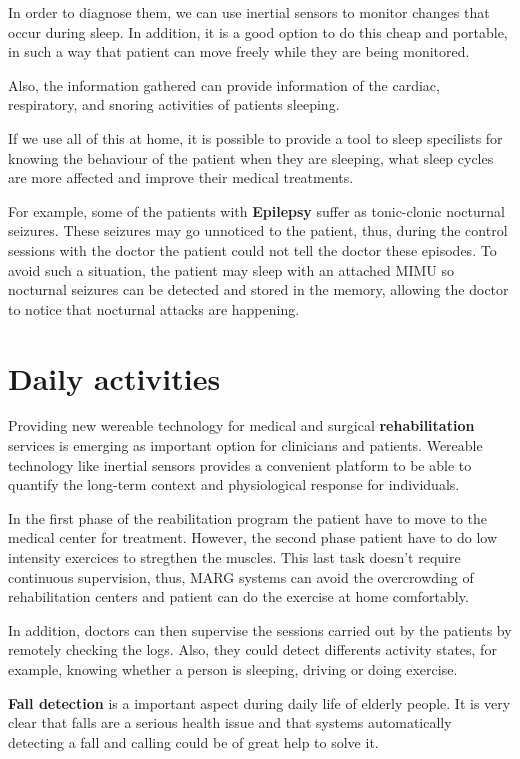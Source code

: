 In order to diagnose them, we can use inertial sensors to monitor changes that occur during sleep. In addition, it is a good option to do this  cheap and portable, in such a way that patient can move freely while they are being monitored\cite{A.Olivares2013}.

Also, the information gathered can provide information  of the cardiac, respiratory, and snoring activities of patients sleeping\cite{SanchezDaniel}.

If we use all of this at home, it is possible to provide a tool to sleep specilists for knowing the behaviour of the patient when they are sleeping, what sleep cycles are more affected and improve their medical  treatments. 

For example,  some of the patients with \textbf{Epilepsy} suffer as tonic-clonic nocturnal seizures. These seizures  may go unnoticed to the patient, thus, during the control sessions with the doctor the patient could not tell the doctor these episodes. To avoid such a situation, the patient may sleep with an attached MIMU so nocturnal seizures can be detected and stored in the memory, allowing the doctor to notice that nocturnal attacks are happening\cite{A.Olivares2013}. 

\section{Daily activities }
Providing new wereable technology for medical and surgical \textbf{rehabilitation} services is emerging as important option for clinicians and patients. Wereable technology like inertial sensors provides  a convenient platform to be able to quantify the long-term context and physiological response for  individuals\cite{Sung}.

In the first phase of the reabilitation program the patient have to move to the medical center for treatment. However, the second phase patient have to do low intensity exercices to stregthen  the muscles. This last task doesn’t require continuous  supervision, thus, MARG systems can avoid the overcrowding of rehabilitation centers and patient can do the exercise at home comfortably\cite{A.Olivares2013}.

In addition, doctors can then supervise the sessions carried out by the patients by remotely checking the logs. Also, they could detect differents activity states, for example, knowing whether a person  is sleeping, driving or doing exercise\cite{A.Olivares2013}.

\textbf{Fall detection} is a important aspect during daily life of elderly people. It is very clear that falls are a serious health issue and that systems automatically detecting a fall and calling could be of great help to solve it. 


